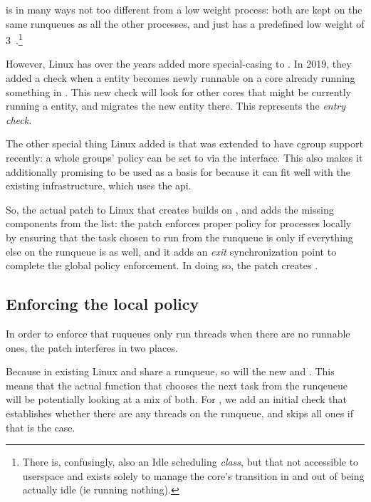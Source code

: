 \schedidle{} is in many ways not too different from a low weight \schednormal{}
process: both are kept on the same runqueues as all the other \schednormal{}
processes, and \schedidle{} just has a predefined low weight of
3~\cite{TODO}.\footnote{There is, confusingly, also an Idle scheduling
\textit{class}, but that not accessible to userspace and exists solely to manage
the core's transition in and out of being actually idle (ie running nothing).}

However, Linux has over the years added more special-casing to \schedidle{}. In
2019, they added a check when a \schednormal{} entity becomes newly runnable on
a core already running something in \schednormal{}. This new check will look for
other cores that might be currently running a \schedidle{} entity, and migrates
the new entity there. This represents the \textit{entry check}.

The other special thing Linux added is that \schedidle{} was extended to have
cgroup support recently\cite{TODO}: a whole groups' policy can be set to
\schedidle{} via the \cgroups{} interface. This also makes it additionally
promising to be used as a basis for \schedbe{} because it can fit well with the
existing infrastructure, which uses the \cgroups{} api.

So, the actual patch to Linux that creates \schedbe{} builds on \schedidle{},
and adds the missing components from the list: the patch enforces proper policy
for \schedbe{} processes locally by ensuring that the task chosen to run from
the runqueue is only \schedidle{} if everything else on the runqueue is as well,
and it adds an \textit{exit} synchronization point to complete the global policy
enforcement. In doing so, the patch creates \schedbe{}.

\subsection{Enforcing the local policy}

In order to enforce that ruqueues only run \schedbe{} threads when there are no
runnable \schednormal{} ones, the patch interferes in two places. 

Because in existing Linux \schedidle{} and \schednormal{} share a runqueue, so
will the new \schedbe{} and \schednormal{}. This means that the actual function
that chooses the next task from the runqeueue will be potentially looking at a
mix of both. For \schedbe{}, we add an initial check that establishes whether
there are any \schednormal{} threads on the runqueue, and skips all \schedbe{}
ones if that is the case. 

